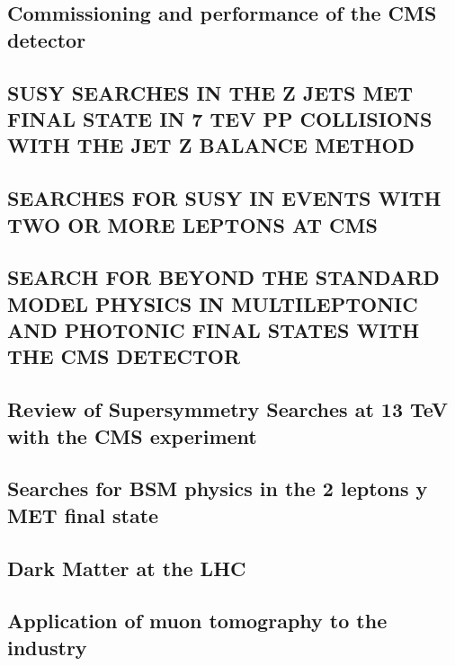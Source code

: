 \documentclass[a4paper, 11pt, twoside, openright]{report}
\begin{document}
\subsection{Commissioning and performance of the CMS detector}

\subsection{SUSY SEARCHES IN THE Z JETS MET FINAL STATE IN 7 TEV PP COLLISIONS WITH THE JET Z BALANCE METHOD}

\subsection{SEARCHES FOR SUSY IN EVENTS WITH TWO OR MORE LEPTONS AT CMS}

\subsection{SEARCH FOR BEYOND THE STANDARD MODEL PHYSICS IN MULTILEPTONIC AND PHOTONIC FINAL STATES WITH THE CMS DETECTOR}

\subsection{Review of Supersymmetry Searches at 13 TeV with the CMS experiment}

\subsection{Searches for BSM physics in the 2 leptons y MET final state}

\subsection{Dark Matter at the LHC}

\subsection{Application of muon tomography to the industry}

\end{document}
